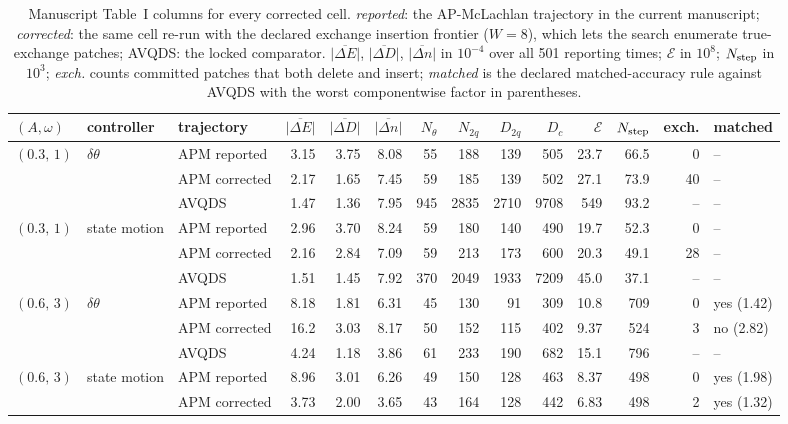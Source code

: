 \documentclass[10pt]{article}
\begin{document}
\begin{table}[H]\centering\scriptsize\setlength{\tabcolsep}{3pt}
\caption{Manuscript Table~I columns for every corrected cell.  \emph{reported}: the AP-McLachlan trajectory in the current manuscript; \emph{corrected}: the same cell re-run with the declared exchange insertion frontier ($W=8$), which lets the search enumerate true-exchange patches; AVQDS: the locked comparator.  $\overline{|\Delta E|}$, $\overline{|\Delta D|}$, $\overline{|\Delta n|}$ in $10^{-4}$ over all 501 reporting times; $\mathcal E$ in $10^{8}$; $N_{\rm step}$ in $10^{3}$; \emph{exch.} counts committed patches that both delete and insert; \emph{matched} is the declared matched-accuracy rule against AVQDS with the worst componentwise factor in parentheses.}
\begin{tabular}{lllrrrrrrrrrrl}\toprule
$(A,\omega)$ & controller & trajectory & $\overline{|\Delta E|}$ & $\overline{|\Delta D|}$ & $\overline{|\Delta n|}$ & $N_\theta$ & $N_{2q}$ & $D_{2q}$ & $D_c$ & $\mathcal E$ & $N_{\rm step}$ & exch. & matched \\ \midrule
$(0.3,\,1)$ & $\delta\theta$ & APM reported & 3.15 & 3.75 & 8.08 & 55 & 188 & 139 & 505 & 23.7 & 66.5 & 0 & -- \\
 &  & APM corrected & 2.17 & 1.65 & 7.45 & 59 & 185 & 139 & 502 & 27.1 & 73.9 & 40 & -- \\
 &  & AVQDS & 1.47 & 1.36 & 7.95 & 945 & 2835 & 2710 & 9708 & 549 & 93.2 & -- & -- \\
\addlinespace[2pt]
$(0.3,\,1)$ & state motion & APM reported & 2.96 & 3.70 & 8.24 & 59 & 180 & 140 & 490 & 19.7 & 52.3 & 0 & -- \\
 &  & APM corrected & 2.16 & 2.84 & 7.09 & 59 & 213 & 173 & 600 & 20.3 & 49.1 & 28 & -- \\
 &  & AVQDS & 1.51 & 1.45 & 7.92 & 370 & 2049 & 1933 & 7209 & 45.0 & 37.1 & -- & -- \\
\addlinespace[2pt]
$(0.6,\,3)$ & $\delta\theta$ & APM reported & 8.18 & 1.81 & 6.31 & 45 & 130 & 91 & 309 & 10.8 & 709 & 0 & yes (1.42) \\
 &  & APM corrected & 16.2 & 3.03 & 8.17 & 50 & 152 & 115 & 402 & 9.37 & 524 & 3 & no (2.82) \\
 &  & AVQDS & 4.24 & 1.18 & 3.86 & 61 & 233 & 190 & 682 & 15.1 & 796 & -- & -- \\
\addlinespace[2pt]
$(0.6,\,3)$ & state motion & APM reported & 8.96 & 3.01 & 6.26 & 49 & 150 & 128 & 463 & 8.37 & 498 & 0 & yes (1.98) \\
 &  & APM corrected & 3.73 & 2.00 & 3.65 & 43 & 164 & 128 & 442 & 6.83 & 498 & 2 & yes (1.32) \\

\end{tabular}
\end{table}
\end{document}
